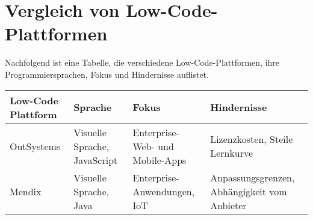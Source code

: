 
\section{Vergleich von Low-Code-Plattformen}
Nachfolgend ist eine Tabelle, die verschiedene Low-Code-Plattformen, ihre Programmiersprachen, Fokus und Hindernisse auflistet.

\begin{longtable}{|m{3cm}|m{3cm}|m{4cm}|m{5cm}|}
\hline
\textbf{Low-Code Plattform} & \textbf{Sprache} & \textbf{Fokus} & \textbf{Hindernisse} \\
\hline
\endhead
OutSystems & Visuelle Sprache, JavaScript & Enterprise-Web- und Mobile-Apps & Lizenzkosten, Steile Lernkurve \\
\hline
Mendix & Visuelle Sprache, Java & Enterprise-Anwendungen, IoT & Anpassungsgrenzen, Abhängigkeit vom Anbieter \\
\hline

\end{longtable}